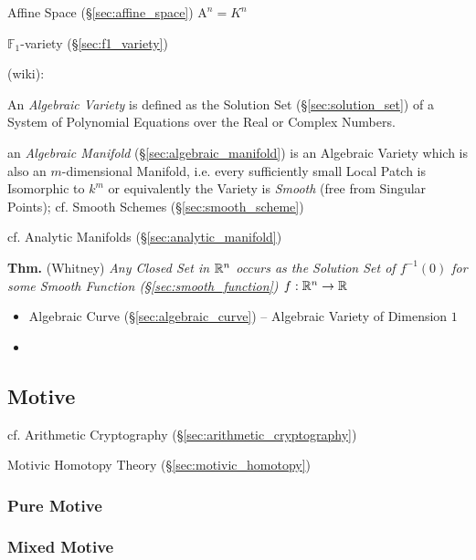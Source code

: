 Affine Space (\S\ref{sec:affine_space}) $\mathrm{A}^n = K^n$

\fist $\mathbb{F}_1$-variety (\S\ref{sec:f1_variety})


(wiki):

An \emph{Algebraic Variety} is defined as the Solution Set
(\S\ref{sec:solution_set}) of a System of Polynomial Equations over the Real or
Complex Numbers.

\fist an \emph{Algebraic Manifold} (\S\ref{sec:algebraic_manifold}) is an
Algebraic Variety which is also an $m$-dimensional Manifold, i.e. every
sufficiently small Local Patch is Isomorphic to $k^m$ or equivalently the
Variety is \emph{Smooth} (free from Singular Points); cf. Smooth Schemes
(\S\ref{sec:smooth_scheme})

cf. Analytic Manifolds (\S\ref{sec:analytic_manifold})

\textbf{Thm.} (Whitney) \emph{Any Closed Set in $\mathbb{R}^n$ occurs as the
  Solution Set of $f^{-1}(0)$ for some Smooth Function
  (\S\ref{sec:smooth_function}) $f : \mathbb{R}^n \rightarrow \mathbb{R}$}

\begin{itemize}
  \item Algebraic Curve (\S\ref{sec:algebraic_curve}) -- Algebraic Variety of
    Dimension $1$
  \item
\end{itemize}



\subsection{Motive}\label{sec:motive}

cf. Arithmetic Cryptography (\S\ref{sec:arithmetic_cryptography})

Motivic Homotopy Theory (\S\ref{sec:motivic_homotopy})



\subsubsection{Pure Motive}\label{sec:pure_motive}

\subsubsection{Mixed Motive}\label{sec:mixed_motive}




